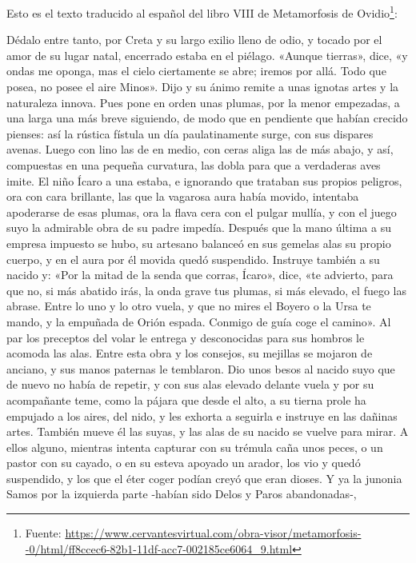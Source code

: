 
Esto es el texto traducido al español del libro VIII de Metamorfosis de Ovidio\footnote{Fuente: \url{https://www.cervantesvirtual.com/obra-visor/metamorfosis--0/html/ff8ccec6-82b1-11df-acc7-002185ce6064_9.html}}:


Dédalo entre tanto, por Creta y su largo exilio
lleno de odio, y tocado por el amor de su lugar natal,
encerrado estaba en el piélago. «Aunque tierras», dice, «y ondas
me oponga, mas el cielo ciertamente se abre; iremos por allá.
Todo que posea, no posee el aire Minos».
Dijo y su ánimo remite a unas ignotas artes
y la naturaleza innova. Pues pone en orden unas plumas,
por la menor empezadas, a una larga una más breve siguiendo,
de modo que en pendiente que habían crecido pienses: así la rústica fístula
un día paulatinamente surge, con sus dispares avenas.
Luego con lino las de en medio, con ceras aliga las de más abajo,
y así, compuestas en una pequeña curvatura, las dobla
para que a verdaderas aves imite. El niño Ícaro a una
estaba, e ignorando que trataban sus propios peligros,
ora con cara brillante, las que la vagarosa aura había movido,
intentaba apoderarse de esas plumas, ora la flava cera con el pulgar
mullía, y con el juego suyo la admirable obra
de su padre impedía. Después que la mano última a su empresa
impuesto se hubo, su artesano balanceó en sus gemelas alas
su propio cuerpo, y en el aura por él movida quedó suspendido.
Instruye también a su nacido y: «Por la mitad de la senda que corras,
Ícaro», dice, «te advierto, para que no, si más abatido irás,
la onda grave tus plumas, si más elevado, el fuego las abrase.
Entre lo uno y lo otro vuela, y que no mires el Boyero
o la Ursa te mando, y la empuñada de Orión espada.
Conmigo de guía coge el camino». Al par los preceptos del volar
le entrega y desconocidas para sus hombros le acomoda las alas.
Entre esta obra y los consejos, su mejillas se mojaron de anciano,
y sus manos paternas le temblaron. Dio unos besos al nacido suyo
que de nuevo no había de repetir, y con sus alas elevado
delante vuela y por su acompañante teme, como la pájara que desde el alto,
a su tierna prole ha empujado a los aires, del nido,
y les exhorta a seguirla e instruye en las dañinas artes.
También mueve él las suyas, y las alas de su nacido se vuelve para mirar.
A ellos alguno, mientras intenta capturar con su trémula caña unos peces,
o un pastor con su cayado, o en su esteva apoyado un arador,
los vio y quedó suspendido, y los que el éter coger podían
creyó que eran dioses. Y ya la junonia Samos
por la izquierda parte -habían sido Delos y Paros abandonadas-,
